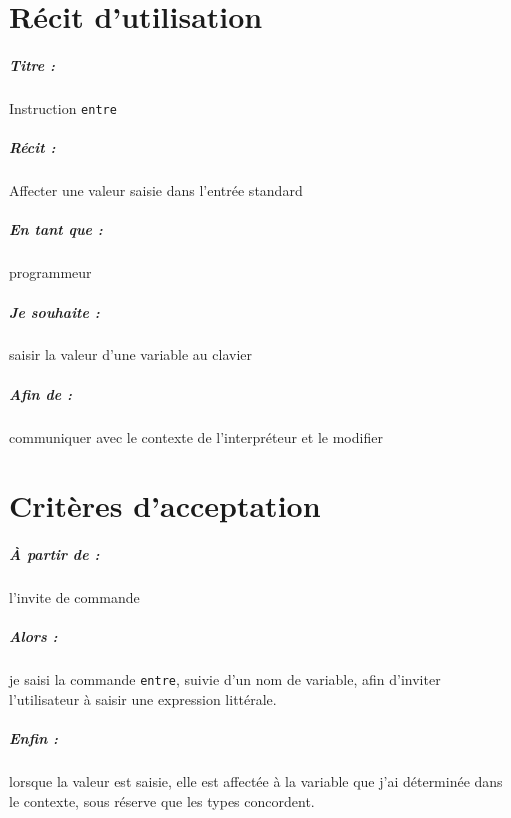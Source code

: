\documentclass[12pt,a5paper, notitle, oneside]{report}
\begin{document}
    \chapter*{Récit d'utilisation}

    \paragraph{Titre : } Instruction \verb|entre|
    \paragraph{Récit : } Affecter une valeur saisie dans l'entrée standard
    \paragraph{En tant que : } programmeur
    \paragraph{Je souhaite : } saisir la valeur d'une variable au clavier
    \paragraph{Afin de : } communiquer avec le contexte de l'interpréteur
        et le modifier
    \newpage

    \chapter*{Critères d'acceptation}

    \paragraph{À partir de : } l'invite de commande
    \paragraph{Alors : } je saisi la commande \verb|entre|, suivie d'un
        nom de variable, afin d'inviter l'utilisateur à saisir une expression littérale.
    \paragraph{Enfin : } lorsque la valeur est saisie, elle est affectée
        à la variable que j'ai déterminée dans le contexte, sous réserve
        que les types concordent.
\end{document}
